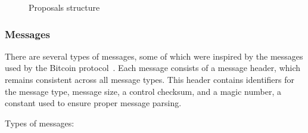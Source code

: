 \begin{figure}[h]
    \begin{center}
    \end{center}
    \caption{Proposals structure}
    \label{figure:my.bc.proposals.structure}
\end{figure}

\subsubsection{Messages}

There are several types of messages, some of which were inspired by the messages used by the Bitcoin protocol~\cite{bitcoin.network.protocol}. Each message consists of a message header, which remains consistent across all message types. This header contains identifiers for the message type, message size, a control checksum, and a magic number, a constant used to ensure proper message parsing.

Types of messages:

